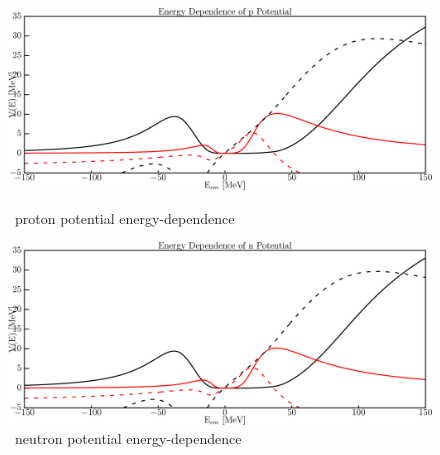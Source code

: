 \begin{figure}[H]
    \centering
    \begin{minipage}{0.45\textwidth}
        \centering
        \includegraphics[width=1.0\textwidth]{figures/o16_protonPotentials.png}
        \caption{\oSix\ proton potential energy-dependence}
        \label{DOMFitData_o16_proton_potentialComponent_energy}
    \end{minipage}\hfill
    \begin{minipage}{0.45\textwidth}
        \centering
        \includegraphics[width=1.0\textwidth]{figures/o16_neutronPotentials.png}
        \caption{\oSix\ neutron potential energy-dependence}
        \label{DOMFitData_o16_neutron_potentialComponent_energy}
    \end{minipage}
\end{figure}


